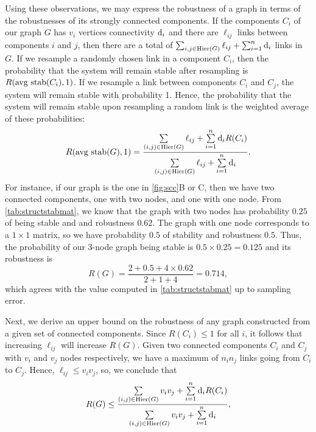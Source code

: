 Using these observations, we may express the robustness of a graph in
terms of the robustnesses of its strongly connected components.  If
the components $C_i$ of our graph $G$ has $v_i$ vertices connectivity
$\mathrm{d}_i$ and there are $\ell_{ij}$ links between components
$i$ and $j$, then there are a total of
$\sum_{i,j \in \mathrm{Hier}(G)} \ell_{ij} + \sum_{i=1}^n \mathrm{d}_i$
links in $G$.  If we resample a randomly chosen link in a component
$C_i$, then the probability that the system will remain stable after
resampling is $R(\hbox{avg stab} (C_i), 1)$.  If we resample a link
between components $C_i$ and $C_j$, the system will remain stable with
probability 1.  Hence, the probability that the system will remain
stable upon resampling a random link is the weighted average of these
probabilities:
\begin{align}\label{eq:sccrobustness}
R(\hbox{avg stab} (G), 1) =
\frac{\sum\limits_{(i,j) \in \mathrm{Hier}(G)} \ell_{ij} +
      \sum\limits_{i=1}^n \mathrm{d}_i R(C_i)}
     {\sum\limits_{(i,j) \in \mathrm{Hier}(G)} \ell_{ij} +
      \sum\limits_{i=1}^n \mathrm{d}_i}.
\end{align}
For instance, if our graph is the one in \ref{fig:scc}B or C, then we have two connected components, one with two nodes, and one with one node.  From \ref{tab:structstabmat}, we know that the graph with two nodes has probability $0.25$ of being stable and and robustness $0.62$.  The graph with one node corresponds to a $1 \times 1$ matrix, so we have probability $0.5$ of stability and robustness $0.5$.  Thus, the probability of our 3-node graph being stable is $0.5 \times 0.25 = 0.125$ and its robustness is
\[
R(G) = \frac{2 + 0.5 + 4 \times 0.62}{2 + 1 + 4} = 0.714,
\]
which agrees with the value computed in \ref{tab:structstabmat} up to
sampling error.

Next, we derive an upper bound on the robustness of any graph
constructed from a given set of connected components.  Since
$R(C_i) \le 1$ for all $i$, it follows that increasing $\ell_{ij}$ will
increase $R(G)$.  Given two connected components $C_i$ and $C_j$ with
$v_i$ and $v_j$ nodes respectively, we have a maximum of $n_i n_j$
links going from $C_i$ to $C_j$.  Hence, $\ell_{ij} \le v_i v_j$, so,
we conclude that
\begin{align}
R(G) \le \frac{\sum\limits_{(i,j) \in \mathrm{Hier}(G)} v_i v_j +
               \sum\limits_{i=1}^n \mathrm{d}_i R(C_i)}
              {\sum\limits_{(i,j) \in \mathrm{Hier}(G)} v_i v_j +
               \sum\limits_{i=1}^n \mathrm{d}_i},
\end{align}

